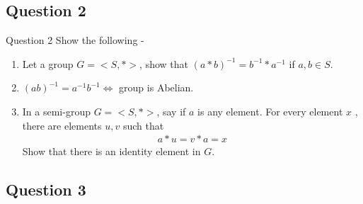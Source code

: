 \documentclass[xcolor=svgnames]{beamer}
\begin{document}
\subsection{Question 2}
\begin{frame}{Question 2}
 Show the following - 
\begin{enumerate}
    \item Let a group $G = <S,*>$, show that $(a*b)^{-1} = b^{-1}*a^{-1}$ if $a,b \in S$.
    \item $(ab)^{-1} = a^{-1}b^{-1} \iff $ group is Abelian.
    \item In a semi-group $G = <S,*>$, say if $a$ is any element. For every element $x$ , there are elements $u,v$ such that 
    \begin{align*}
        a*u = v*a = x
    \end{align*}
    Show that there is an identity element in $G$.
\end{enumerate}
   
\end{frame}
 

\subsection{Question 3}
\end{document}
